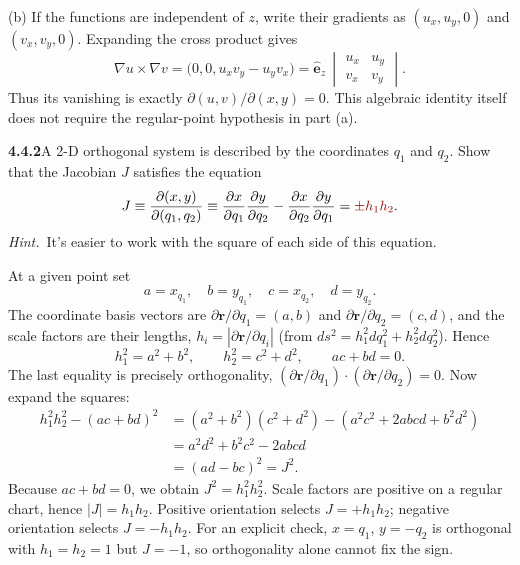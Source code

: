 (b) If the functions are independent of $z$, write their gradients as
$(u_x,u_y,0)$ and $(v_x,v_y,0)$. Expanding the cross product gives
\[
\nabla u\times\nabla v
=\bigl(0,0,u_xv_y-u_yv_x\bigr)
=\hat{\mathbf e}_z\,
  \begin{vmatrix}u_x&u_y\\v_x&v_y\end{vmatrix}.
\]
Thus its vanishing is exactly
$\boxed{\partial(u,v)/\partial(x,y)=0}$. This algebraic identity
itself does not require the regular-point hypothesis in part (a).

\par\bigskip
\noindent\textbf{4.4.2}\quad A 2-D orthogonal system is described by the
coordinates $q_{1}$ and $q_{2}$. Show that the Jacobian $J$ satisfies the
equation
\[
J\equiv\frac{\partial(x,y)}{\partial(q_{1},q_{2})}
\equiv\frac{\partial x}{\partial q_{1}}\frac{\partial y}{\partial q_{2}}
-\frac{\partial x}{\partial q_{2}}\frac{\partial y}{\partial q_{1}}=\erratum{\pm h_{1}h_{2}}.
\]
\emph{Hint.}~It's easier to work with the square of each side of this
equation.
\solution
{}

At a given point set
\[
a=x_{q_1},\quad b=y_{q_1},\quad c=x_{q_2},\quad d=y_{q_2}.
\]
The coordinate basis vectors are
$\partial\mathbf r/\partial q_1=(a,b)$ and
$\partial\mathbf r/\partial q_2=(c,d)$, and the scale factors are their
lengths, $h_i=|\partial\mathbf r/\partial q_i|$ (from
$ds^2=h_1^2dq_1^2+h_2^2dq_2^2$). Hence
\[
h_1^2=a^2+b^2,\qquad h_2^2=c^2+d^2,\qquad ac+bd=0.
\]
The last equality is precisely orthogonality,
$(\partial\mathbf r/\partial q_1)\cdot(\partial\mathbf r/\partial q_2)=0$.
Now expand the squares:
\begin{align*}
h_1^2h_2^2-(ac+bd)^2
&=(a^2+b^2)(c^2+d^2)-(a^2c^2+2abcd+b^2d^2)\\
&=a^2d^2+b^2c^2-2abcd\\
&=(ad-bc)^2=J^2.
\end{align*}
Because $ac+bd=0$, we obtain $J^2=h_1^2h_2^2$. Scale factors are
positive on a regular chart, hence $|J|=h_1h_2$. Positive orientation
selects $J=+h_1h_2$; negative orientation selects $J=-h_1h_2$.
For an explicit check, $x=q_1$, $y=-q_2$ is orthogonal with
$h_1=h_2=1$ but $J=-1$, so orthogonality alone cannot fix the sign.

